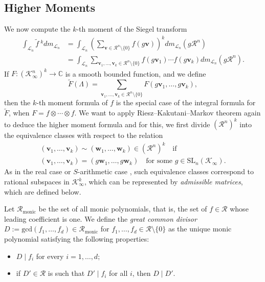 \documentclass[11pt,a4paper,reqno]{amsart}
\def\gcd{\mathrm{gcd}}
\newcommand{\SL}{\mathrm{SL}}
\newcommand{\Rmo}{\mathcal R_{\text{monic}}}
\theoremstyle{definition}
\theoremstyle{remark}
\numberwithin{equation}{section}
\begin{document}
\subsection{Higher Moments}
We now compute the $k$-th moment of the Siegel transform
\begin{equation}
\begin{split}
\label{eqn:kMoment}
    \int_{\mathcal{L}_n}\widetilde{f}\:^kdm_{\mathcal{L}_n}
    &=\int_{\mathcal{L}_n}\left(\sum_{\mathbf{v}\in \mathcal{R}^n\setminus\{0\}}f(g\mathbf{v})\right)^kdm_{\mathcal{L}_n}(g\mathcal{R}^n)\\
    &=\int_{\mathcal{L}_n}\sum_{\mathbf{v}_1,\dots,\mathbf{v}_k\in \mathcal{R}^n\setminus\{0\}}f(g\mathbf{v}_1)\cdots f(g\mathbf{v}_k)dm_{\mathcal{L}_n}(g\mathcal{R}^n).
\end{split}
\end{equation}
If $F:(\mathcal K_\infty^n)^k\rightarrow \mathbb C$ is a smooth bounded function, and we define 
\[
\widetilde{F}(\Lambda)=\sum_{\mathbf{v}_1,\dots,\mathbf{v}_k\in \mathcal{R}^n\setminus\{0\}} F(g\mathbf{v}_1, \ldots, g\mathbf{v}_k),
\]
then the $k$-th moment formula of $f$ is the special case of the integral formula for $\widetilde{F}$, when $F=f\otimes \cdots \otimes f$.
We want to apply Riesz--Kakutani--Markov theorem again to deduce the higher moment formula and for this, we first divide $(\mathcal{R}^n)^k$ into the equivalence classes with respect to the relation
\[\begin{gathered}
(\mathbf{v}_1, \ldots, \mathbf{v}_k)\sim (\mathbf{w}_1, \ldots, \mathbf{w}_k)\in (\mathcal R^n)^k\quad\text{if}\\
(\mathbf{v}_1, \ldots, \mathbf{v}_k)=(g\mathbf{w}_1, \ldots, g\mathbf{w}_k)\quad\text{for some }g\in \SL_n(\mathcal K_\infty).
\end{gathered}\]
As in the real case \cite{Rogers1955} or $S$-arithmetic case \cite{Han}, 
such equivalence classes correspond to rational subspaces in $\mathcal K_\infty^k$, which can be represented by \emph{admissible matrices}, which are defined below.

Let $\Rmo$ be the set of all monic polynomials, that is, the set of $f\in \mathcal R$ whose leading coefficient is one. We define the \emph{great common divisor} $D:=\gcd(f_1,\dots,f_d)\in \Rmo$ for $f_1,\dots,f_d\in \mathcal{R}\setminus\{0\}$ as the unique monic polynomial satisfying the following properties:
\begin{itemize}
    \item $D\mid f_i$ for every $i=1,\dots,d$;
    \item if  $D'\in \mathcal R$ is such that $D'\mid f_i$ for all $i$, then $D\mid D'$.
\end{itemize}
\end{document}
